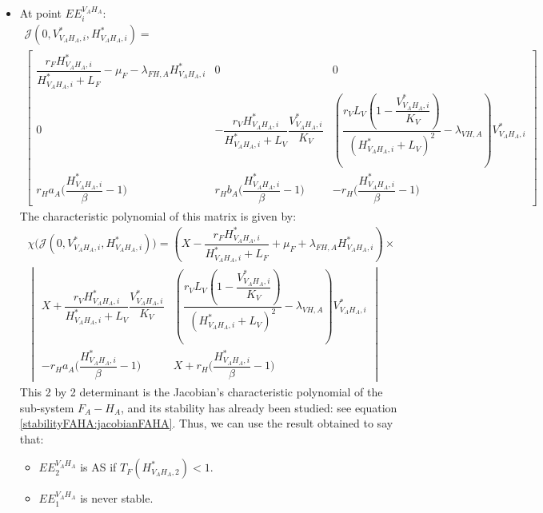 \documentclass{article}
\newcommand{\lfa}{\lambda_{FH, A}}
\newcommand{\lva}{\lambda_{VH, A}}
\begin{document}
\begin{itemize}
\item At point $EE^{V_AH_A}_i$:
\begin{multline*}
\mathcal{J}(0, V^*_{V_AH_A, i},H^*_{V_AH_A, i}) = \\ \begin{bmatrix}
\dfrac{r_F H^*_{V_AH_A, i}}{H^*_{V_AH_A, i} + L_F} - \mu_F - \lfa H^*_{V_AH_A, i} & 0 & 0\\ 
0& -\dfrac{r_V H^*_{V_AH_A, i}}{H^*_{V_AH_A, i} + L_V}\dfrac{V^*_{V_AH_A, i}}{K_V} & \left(\dfrac{r_V L_V \left(1-\dfrac{V^*_{V_AH_A, i}}{K_V}\right)}{(H^*_{V_AH_A, i}+L_V)^2}  - \lva\right) V^*_{V_AH_A, i} \\
 r_H a_A \Big(\dfrac{H^*_{V_AH_A, i}}{\beta}-1\Big) & r_H b_A \Big(\dfrac{H^*_{V_AH_A, i}}{\beta}-1\Big) & -r_H \Big(\dfrac{H^*_{V_AH_A, i}}{\beta}-1\Big)
\end{bmatrix}
\end{multline*}
The characteristic polynomial of this matrix is given by:
\begin{multline}
\chi\Big(\mathcal{J}(0, V^*_{V_AH_A, i},H^*_{V_AH_A, i})\Big) = \left(X - \dfrac{r_F H^*_{V_AH_A, i}}{H^*_{V_AH_A, i} + L_F} + \mu_F + \lfa H^*_{V_AH_A, i}\right) \times \\
\begin{vmatrix}
X + \dfrac{r_V H^*_{V_AH_A, i}}{H^*_{V_AH_A, i} + L_V}\dfrac{V^*_{V_AH_A, i}}{K_V} & \left(\dfrac{r_V L_V \left(1-\dfrac{V^*_{V_AH_A, i}}{K_V}\right)}{(H^*_{V_AH_A, i}+L_V)^2}  - \lva\right) V^*_{V_AH_A, i} \\
-r_H a_A \Big(\dfrac{H^*_{V_AH_A, i}}{\beta}-1\Big) & X + r_H \Big(\dfrac{H^*_{V_AH_A, i}}{\beta}-1\Big)
\end{vmatrix}
\end{multline}
This 2 by 2 determinant is the Jacobian's characteristic polynomial of the sub-system $F_A-H_A$, and its stability has already been studied: see equation \eqref{stabilityFAHA:jacobianFAHA}.
Thus, we can use the result obtained to say that:
\begin{itemize}
\item $EE^{V_AH_A}_2$ is AS if $T_F(H^*_{V_AH_A, 2}) < 1$.
\item $EE^{V_AH_A}_1$ is never stable.
\end{itemize}


\end{itemize}
\end{document}
